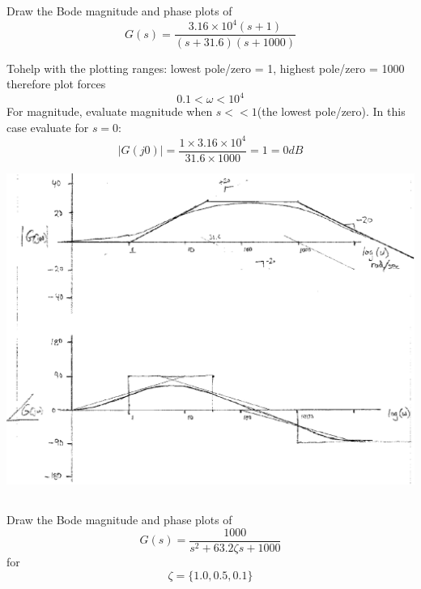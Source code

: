 \documentclass{article}	%
\begin{document}
\subsection{}
Draw the Bode magnitude and phase plots of
\[
G(s) = \frac{3.16\times10^4(s+1)}{(s+31.6)(s+1000)}
\]

\begin{solution}
Tohelp with the plotting ranges: lowest pole/zero = 1, highest pole/zero = 1000 therefore plot forces
\[
0.1 < \omega < 10^4
\]
For magnitude, evaluate magnitude when $s << 1$(the lowest pole/zero).   In this case evaluate for $s=0$:
\[
|G(j0)| = \frac {1\times 3.16\times 10^4} {31.6\times1000} = 1 = 0dB
\]


\includegraphics[width=6.0in]{00953a.png}

\end{solution}






\subsection{}
Draw the Bode magnitude and phase plots of
\[
G(s) = \frac{1000}{s^2 + 63.2\zeta s + 1000}
\]
for
\[
\zeta = \{1.0, 0.5, 0.1\}
\]
\end{document}
